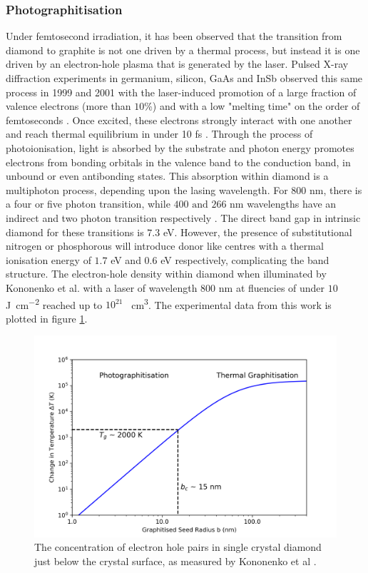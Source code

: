 \begin{refsection}
\subsubsection{Photographitisation}
Under femtosecond irradiation, it has been observed that the transition from diamond to graphite is not one driven by a thermal process, but instead it is one driven by an electron-hole plasma that is generated by the laser. Pulsed X-ray diffraction experiments in germanium, silicon, GaAs and InSb observed this same process in 1999 and 2001 with the laser-induced promotion of a large fraction of valence electrons (more than $10$\%) and with a low "melting time" on the order of femtoseconds \cite{siders:1999,rousse:2001}. Once excited, these electrons strongly interact with one another and reach thermal equilibrium in under 10 \si{\femto\second} \cite{elsaesser:1991}.
Through the process of photoionisation, light is absorbed by the substrate and photon energy promotes electrons from bonding orbitals in the valence band to the conduction band, in unbound or even antibonding states. This absorption within diamond is a multiphoton process, depending upon the lasing wavelength. For $800$ \si{\nano\metre}, there is a four or five photon transition, while $400\text{ and }266$ \si{\nano\metre} wavelengths have an indirect and two photon transition respectively \cite{preuss:1995}. The direct band gap in intrinsic diamond for these transitions is $7.3$ \si{\electronvolt}. However, the presence of substitutional nitrogen or phosphorous will introduce donor like centres with a thermal ionisation energy of $1.7$ \si{\electronvolt} and $0.6$ \si{\electronvolt} respectively, complicating the band structure. The electron-hole density within diamond when illuminated by Kononenko et al. with a  laser of wavelength $800$ \si{\nano\metre} at fluencies of under $10$ \si{\joule\per\centi\metre\squared} reached up to $10^{21}$ \si{\per\centi\metre\cubed}. The experimental data from this work is plotted in figure \ref{fig:electronholes}.

\begin{figure}
	\centering
	\includegraphics[width=\linewidth]{Chapter2/Figs/Raster/HDelectronholes.png}
	\caption{The concentration of electron hole pairs in single crystal diamond just below the crystal surface, as measured by Kononenko et al \cite{kononenko:2014}.}
	\label{fig:electronholes}
\end{figure}


\end{refsection}
